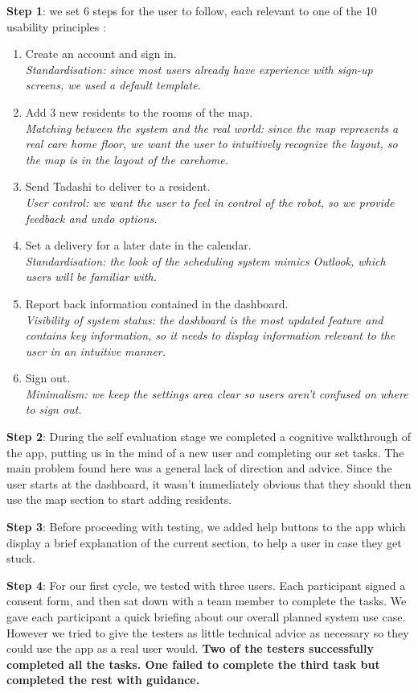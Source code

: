 \documentclass{article}
\begin{document}
{\bf Step 1}: we set 6 steps for the user to follow, each relevant to one of the 10 usability principles \cite{heuristics}:
\begin{enumerate}
  \item Create an account and sign in. \\{\it Standardisation: since most users already have experience with sign-up screens, we used a default template.}
  \item Add 3 new residents to the rooms of the map. \\{\it Matching between the system and the real world: since the map represents a real care home floor, we want the user to intuitively recognize the layout, so the map is in the layout of the carehome.}
  \item Send Tadashi to deliver to a resident. \\{\it User control: we want the user to feel in control of the robot, so we provide feedback and undo options.}
  \item Set a delivery for a later date in the calendar. \\{\it Standardisation: the look of the scheduling system mimics Outlook, which users will be familiar with.}
  \item Report back information contained in the dashboard. \\{\it Visibility of system status: the dashboard is the most updated feature and contains key information, so it needs to display information relevant to the user in an intuitive manner.}
  \item Sign out. \\{\it Minimalism: we keep the settings area clear so users aren't confused on where to sign out.}
\end{enumerate}

{\bf Step 2}: During the self evaluation stage we completed a cognitive walkthrough of the app, putting us in the mind of a new user and completing our set tasks. The main problem found here was a general lack of direction and advice. Since the user starts at the dashboard, it wasn't immediately obvious that they should then use the map section to start adding residents.

{\bf Step 3}: Before proceeding with testing, we added help buttons to the app which display a brief explanation of the current section, to help a user in case they get stuck.

{\bf Step 4}: For our first cycle, we tested with three users. Each participant signed a consent form, and then sat down with a team member to complete the tasks. We gave each participant a quick briefing about our overall planned system use case. However we tried to give the testers as little technical advice as necessary so they could use the app as a real user would. {\bf Two of the testers successfully completed all the tasks. One failed to complete the third task but completed the rest with guidance.}
\end{document}
